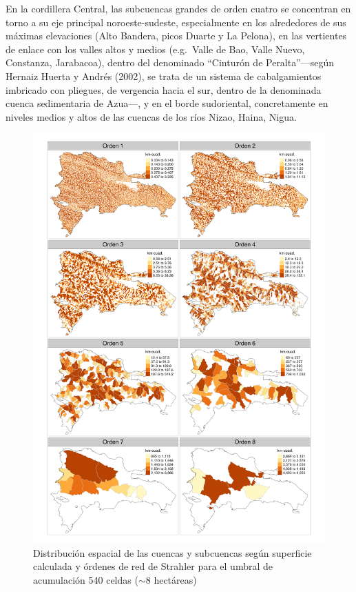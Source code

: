 \documentclass[spanish]{article}
\begin{document}
En la cordillera Central, las subcuencas grandes de orden cuatro se
concentran en torno a su eje principal noroeste-sudeste, especialmente
en los alrededores de sus máximas elevaciones (Alto Bandera, picos
Duarte y La Pelona), en las vertientes de enlace con los valles altos y
medios (e.g.~Valle de Bao, Valle Nuevo, Constanza, Jarabacoa), dentro
del denominado ``Cinturón de Peralta''---según Hernaiz Huerta y Andrés
(2002), se trata de un sistema de cabalgamientos imbricado con pliegues,
de vergencia hacia el sur, dentro de la denominada cuenca sedimentaria
de Azua---, y en el borde sudoriental, concretamente en niveles medios y
altos de las cuencas de los ríos Nizao, Haina, Nigua.

\begin{figure}

{\centering \includegraphics[width=0.8\linewidth]{figuras/cuencas-subcuencas-areas-ordenes} 

}

\caption{Distribución espacial de las cuencas y subcuencas según superficie calculada y órdenes de red de Strahler para el umbral de acumulación 540 celdas ($\sim$8 hectáreas)}\label{fig:ordenredcuencasmapa}
\end{figure}
\end{document}
